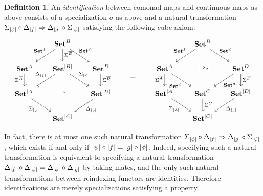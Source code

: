 \documentclass[11pt, oneside, article]{memoir}
\theoremstyle{plain}
\theoremstyle{definition}
\newtheorem{definition}[def]{Definition}
\theoremstyle{remark}
\DeclarePairedDelimiter{\abs}{\lvert}{\rvert}
\newcommand{\namedcat}[1]{\mathbf{#1}}
\newcommand{\Set}{\namedcat{Set}}
\newcommand{\CoalgOn}[2]{{#2}^{#1}}
\newcommand{\CoalgSet}[1]{\CoalgOn{#1}{\Set}}
\newcommand{\clift}[1]{\overline{#1}}
\newcommand{\pts}[1]{{\abs{#1}}}
\newcommand{\one}[1]{\pts{#1}}
\newcommand{\carr}{\Sigma}
\newcommand{\leindex}[1]{\Sigma_{#1}}
\newcommand{\reindex}[1]{\Delta_{#1}}
\newcommand{\car}[1]{\carr^{#1}}
\newcommand{\com}[2]{{#1}^{#2}}
\newcommand{\con}[2]{{#1}^{#2}}
\newcommand{\cmnd}[1]{{#1}}
\newcommand{\cA}{\cmnd{A}}
\newcommand{\cB}{\cmnd{B}}
\newcommand{\cC}{\cmnd{C}}
\newcommand{\cD}{\cmnd{D}}
\newcommand{\ASet}{\CoalgSet{\cA}}
\newcommand{\BSet}{\CoalgSet{\cB}}
\newcommand{\CSet}{\CoalgSet{\cC}}
\newcommand{\DSet}{\CoalgSet{\cD}}
\newcommand{\SetpA}{\Set^\pts{\cA}}
\newcommand{\SetpB}{\Set^\pts{\cB}}
\newcommand{\SetpC}{\Set^\pts{\cC}}
\newcommand{\SetpD}{\Set^\pts{\cD}}
\begin{document}
\begin{definition}\label{def:doubleidset}
  An \emph{identification} between comonad maps and continuous maps as
  above consists of a specialization $\sigma$ as above and a natural
  transformation
  $\leindex{\one{\phi}} \circ \reindex{\one{f}} \Rightarrow
  \reindex{\one{g}} \circ \leindex{\one{\psi}}$ satisfying the
  following cube axiom:
  \[
    \begin{tikzcd}[column sep=17]
      & \BSet & \\
      \ASet & \SetpB & \DSet \\
      \SetpA && \SetpD \\
      & \SetpC
      \arrow["{\con{\Set}{f}}"'{pos=0.4}, from=1-2, to=2-1]
      \arrow["{\car{\clift{\cB}}}"{pos=0.4}, from=1-2, to=2-2]
      \arrow["{\com{\Set}{\psi}}"{pos=0.4}, from=1-2, to=2-3]
      \arrow["{\car{\clift{\cA}}}"'{pos=0.4}, from=2-1, to=3-1]
      \arrow["{\reindex{\one{f}}}"'{pos=0.4}, from=2-2, to=3-1]
      \arrow["{\leindex{\one{\psi}}}"{pos=0.4}, from=2-2, to=3-3]
      \arrow["\Rightarrow"{description}, draw=none, from=2-2, to=4-2]
      \arrow["{\car{\clift{\cD}}}"{pos=0.4}, from=2-3, to=3-3]
      \arrow["{\leindex{\one{\phi}}}"', from=3-1, to=4-2]
      \arrow["{\reindex{\one{g}}}", from=3-3, to=4-2]
    \end{tikzcd}
    \qquad = \qquad
    \begin{tikzcd}[column sep=17]
      & \BSet & \\
      \ASet && \DSet \\
      \SetpA & \CSet & \SetpD \\
      & \SetpC
      \arrow["{\con{\Set}{f}}"'{pos=0.4}, from=1-2, to=2-1]
      \arrow["{\com{\Set}{\psi}}"{pos=0.4}, from=1-2, to=2-3]
      \arrow["{\Rightarrow_\sigma}"{description}, shift left, draw=none, from=1-2, to=3-2]
      \arrow["{\car{\clift{\cA}}}"'{pos=0.4}, from=2-1, to=3-1]
      \arrow["{\com{\Set}{\phi}}"'{pos=0.6}, from=2-1, to=3-2]
      \arrow["{\con{\Set}{g}}"{pos=0.6}, from=2-3, to=3-2]
      \arrow["{\car{\clift{\cD}}}"{pos=0.4}, from=2-3, to=3-3]
      \arrow["{\leindex{\one{\phi}}}"', from=3-1, to=4-2]
      \arrow["{\car{\clift{\cC}}}"{pos=0.4}, from=3-2, to=4-2]
      \arrow["{\reindex{\one{g}}}", from=3-3, to=4-2]
    \end{tikzcd}
  \]
\end{definition}

In fact, there is at most one such natural transformation
$\leindex{\one{\phi}} \circ \reindex{\one{f}} \Rightarrow
\reindex{\one{g}} \circ \leindex{\one{\psi}}$, which exists if and
only if $\one{\psi} \circ \one{f} = \one{g} \circ \one{\phi}$. Indeed,
specifying such a natural transformation is equivalent to specifying a
natural transformation
$\reindex{\one{f}} \circ \reindex{\one{\psi}} = \reindex{\one{\phi}}
\circ \reindex{\one{g}}$ by taking mates, and the only such natural
transformations between reindexing functors are identities. Therefore
identifications are merely specializations satisfying a property.
\end{document}
